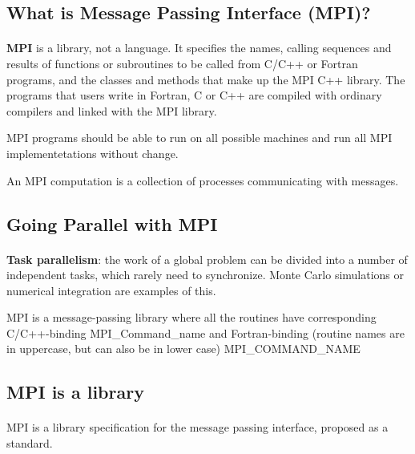 \documentclass[%
oneside,                 %
final,                   %
10pt]{article}
\begin{document}
\subsection{What is Message Passing Interface (MPI)?}

\paragraph{}

\textbf{MPI} is a library, not a language. It specifies the names, calling sequences and results of functions
or subroutines to be called from C/C++ or Fortran programs, and the classes and methods that make up the MPI C++
library. The programs that users write in Fortran, C or C++ are compiled with ordinary compilers and linked
with the MPI library.

MPI programs should be able to run
on all possible machines and run all MPI implementetations without change.

An MPI computation is a collection of processes communicating with messages.


\subsection{Going Parallel with MPI}

\paragraph{}
\textbf{Task parallelism}: the work of a global problem can be divided
into a number of independent tasks, which rarely need to synchronize. 
Monte Carlo simulations or numerical integration are examples of this.


MPI is a message-passing library where all the routines
have corresponding C/C++-binding
\bcppcod
   MPI_Command_name
\ecppcod
and Fortran-binding (routine names are in uppercase, but can also be in lower case)
\bforcod
   MPI_COMMAND_NAME
\eforcod




\subsection{MPI is a library}

\paragraph{}
MPI is a library specification for the message passing interface,
proposed as a standard.
\end{document}
